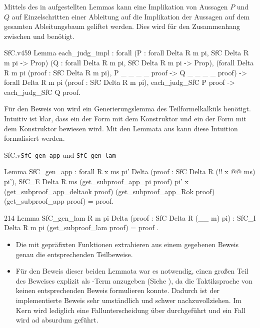 Mittels des in  aufgestellten Lemmas kann eine Implikation von Aussagen $P$ und $Q$ auf Einzelschritten einer Ableitung auf die Implikation der Aussagen auf dem gesamten Ableitungsbaum geliftet werden. Dies wird für den Zusammenhang zwischen  und  benötigt.
\begin{code}{SfC.v}{}{459}
Lemma each_judg_impl : forall 
    (P : forall Delta R m pi, SfC Delta R m pi -> Prop)
    (Q : forall Delta R m pi, SfC Delta R m pi -> Prop), 
  (forall Delta R m pi (proof : SfC Delta R m pi), 
      P _ _ _ _ proof ->  Q _ _ _ _ proof) -> 
    forall Delta R m pi (proof : SfC Delta R m pi), 
      each_judg_SfC P proof -> each_judg_SfC Q proof.
\end{code}

Für den Beweis von  wird ein Generierungslemma des Teilformelkalküls benötigt. Intuitiv ist klar, dass ein  der Form  mit dem Konstruktor  und ein  der Form  mit dem Konstruktor  bewiesen wird. Mit den Lemmata aus  kann diese Intuition formalisiert werden.
\begin{multicode}{SfC.v}{}{\texttt{SfC\_gen\_app} und \texttt{SfC\_gen\_lam}}
\begin{mcode}{90}
Lemma SfC_gen_app : forall R x ms pi' Delta 
    (proof : SfC Delta R (!! x @@ ms) pi'),    
  SfC_E Delta R ms
    (get_subproof_app_pi proof) pi' x
      (get_subproof_app_deltaok proof)
        (get_subproof_app_Rok proof)
          (get_subproof_app proof) = proof.
\end{mcode}
\begin{mcode}{214}
Lemma SfC_gen_lam R m pi Delta (proof : SfC Delta R (\__ m) pi) :
    SfC_I Delta R m pi (get_subproof_lam proof) = proof .
\end{mcode}
\end{multicode}
\begin{remark}
    \begin{itemize}
        \item Die mit  gepräfixten Funktionen extrahieren aus einem gegebenen Beweis genau die entsprechenden Teilbeweise.
        \item Für den Beweis dieser beiden Lemmata war es notwendig, einen großen Teil des Beweises explizit als \tlambda-Term anzugeben (Siehe ), da die Taktiksprache von \coq{} keinen entsprechenden Beweis formulieren konnte. Dadurch ist der implementierte Beweis sehr umständlich und schwer nachzuvollziehen. Im Kern wird lediglich eine Fallunterscheidung über  durchgeführt und ein Fall wird ad absurdum geführt.
    \end{itemize}
\end{remark}


